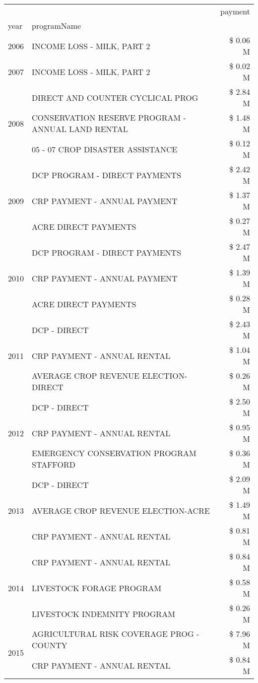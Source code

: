 \begin{tabular}{llr}
\toprule
 &  & payment \\
year & programName &  \\
\midrule
2006 & INCOME LOSS - MILK, PART 2 & \$ 0.06 M \\
\cline{1-3}
2007 & INCOME LOSS - MILK, PART 2 & \$ 0.02 M \\
\cline{1-3}
\multirow[t]{3}{*}{2008} & DIRECT AND COUNTER CYCLICAL PROG & \$ 2.84 M \\
 & CONSERVATION RESERVE PROGRAM - ANNUAL LAND RENTAL & \$ 1.48 M \\
 & 05 - 07 CROP DISASTER ASSISTANCE & \$ 0.12 M \\
\cline{1-3}
\multirow[t]{3}{*}{2009} & DCP PROGRAM - DIRECT PAYMENTS & \$ 2.42 M \\
 & CRP PAYMENT - ANNUAL PAYMENT & \$ 1.37 M \\
 & ACRE DIRECT PAYMENTS & \$ 0.27 M \\
\cline{1-3}
\multirow[t]{3}{*}{2010} & DCP PROGRAM - DIRECT PAYMENTS & \$ 2.47 M \\
 & CRP PAYMENT - ANNUAL PAYMENT & \$ 1.39 M \\
 & ACRE DIRECT PAYMENTS & \$ 0.28 M \\
\cline{1-3}
\multirow[t]{3}{*}{2011} & DCP - DIRECT & \$ 2.43 M \\
 & CRP PAYMENT - ANNUAL RENTAL & \$ 1.04 M \\
 & AVERAGE CROP REVENUE ELECTION-DIRECT & \$ 0.26 M \\
\cline{1-3}
\multirow[t]{3}{*}{2012} & DCP - DIRECT & \$ 2.50 M \\
 & CRP PAYMENT - ANNUAL RENTAL & \$ 0.95 M \\
 & EMERGENCY CONSERVATION PROGRAM STAFFORD & \$ 0.36 M \\
\cline{1-3}
\multirow[t]{3}{*}{2013} & DCP - DIRECT & \$ 2.09 M \\
 & AVERAGE CROP REVENUE ELECTION-ACRE & \$ 1.49 M \\
 & CRP PAYMENT - ANNUAL RENTAL & \$ 0.81 M \\
\cline{1-3}
\multirow[t]{3}{*}{2014} & CRP PAYMENT - ANNUAL RENTAL & \$ 0.84 M \\
 & LIVESTOCK FORAGE PROGRAM & \$ 0.58 M \\
 & LIVESTOCK INDEMNITY PROGRAM & \$ 0.26 M \\
\cline{1-3}
\multirow[t]{3}{*}{2015} & AGRICULTURAL RISK COVERAGE PROG - COUNTY & \$ 7.96 M \\
 & CRP PAYMENT - ANNUAL RENTAL & \$ 0.84 M \\

\end{tabular}
